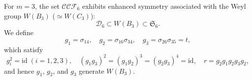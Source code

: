\documentclass[11pt]{amsart}
\theoremstyle{plain}
\theoremstyle{definition}
\theoremstyle{remark}
\begin{document}
For $m=3$, the set $\mathcal{CCF}_{6}$ exhibits enhanced symmetry associated with
the Weyl group $W(B_3)$ ($\simeq W(C_3)$):
\begin{equation}
    \mathcal{D}_6 \subset W(B_3) \subset \mathfrak{S}_6.
\end{equation}
We define
\begin{equation}
    g_1=\sigma_{14}, \quad g_2=\sigma_{16}\sigma_{34}, \quad g_3=\sigma_{26}\sigma_{35}=t, \label{dfn:g123}
\end{equation}
which satisfy
\begin{equation}
g_i^2=\textrm{id} \; (i=1,2,3), \quad (g_1g_3)^2=(g_1g_2)^3=(g_2g_3)^4=\textrm{id}, \quad r=g_2g_1g_2g_3g_2, \label{eq:C3rels.}
\end{equation}
and hence $g_1$, $g_2$, and $g_3$ generate $W(B_3)$.
\end{document}
